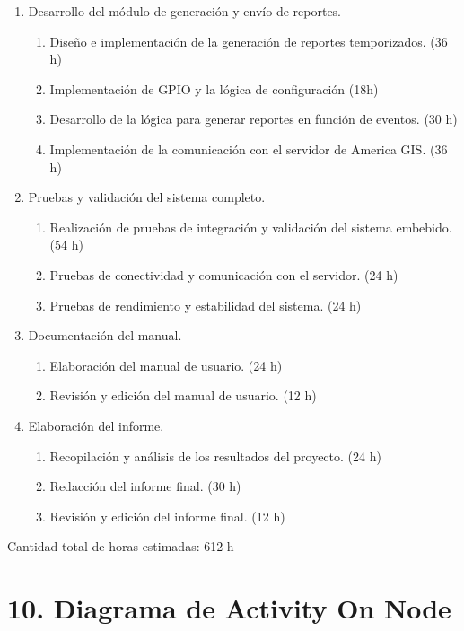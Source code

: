 \documentclass[
11pt, %
codirector, %
]{charter}
\begin{document}
\begin{enumerate}
    \item Desarrollo del módulo de generación y envío de reportes.
    \begin{enumerate}
        \item Diseño e implementación de la generación de reportes temporizados. (36 h)
        \item Implementación de GPIO y la lógica de configuración (18h)
        \item Desarrollo de la lógica para generar reportes en función de eventos. (30 h)
        \item Implementación de la comunicación con el servidor de America GIS. (36 h)
    \end{enumerate}
    
    \item Pruebas y validación del sistema completo.
    \begin{enumerate}
        \item Realización de pruebas de integración y validación del sistema embebido. (54 h)
        \item Pruebas de conectividad y comunicación con el servidor. (24 h)
        \item Pruebas de rendimiento y estabilidad del sistema. (24 h)
    \end{enumerate}
    
    \item Documentación del manual.
    \begin{enumerate}
        \item Elaboración del manual de usuario. (24 h)
        \item Revisión y edición del manual de usuario. (12 h)
    \end{enumerate}
    
    \item Elaboración del informe.
    \begin{enumerate}
        \item Recopilación y análisis de los resultados del proyecto. (24 h)
        \item Redacción del informe final. (30 h)
        \item Revisión y edición del informe final. (12 h)
    \end{enumerate}
\end{enumerate}

Cantidad total de horas estimadas: 612 h

\pagebreak
\section{10. Diagrama de Activity On Node}
\label{sec:AoN}
\end{document}
